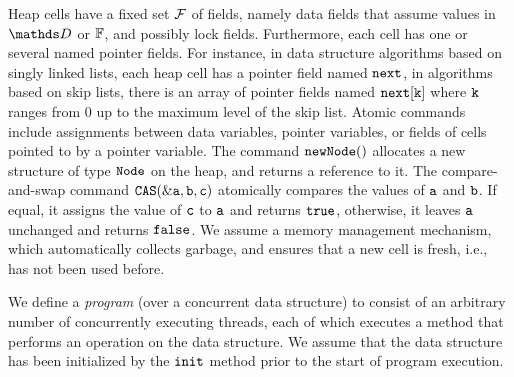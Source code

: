 %
Heap cells have a fixed set $\mathcal{F}$ of fields, namely
data fields that assume values in
$\ddomain$ or $\mathbb{F}$, and possibly lock fields.
Furthermore, each cell has one or several named pointer fields.
For instance, in data structure algorithms based on singly linked lists,
each heap cell has a pointer field named ${\tt next}$, in algorithms
based on skip lists, there is an array of pointer fields named
${\tt next[k]}$ where ${\tt k}$ ranges from $0$ up to the maximum level of the
skip list.
Atomic commands include assignments between data variables, 
pointer variables, or fields of cells pointed to by a pointer variable.
%
The command ${\tt new Node()}$ allocates a new structure of type
${\tt Node}$ on the heap, and returns a reference to it.
%
The compare-and-swap command ${\tt CAS(\&a,b,c)}$ atomically
compares the values of ${\tt a}$ and ${\tt b}$.
If  equal, it assigns the value of
${\tt c}$ to ${\tt a}$  and returns ${\tt true}$, 
otherwise, it leaves ${\tt a}$ unchanged and returns ${\tt false}$. 
%
We assume a memory management mechanism, which automatically collects
garbage, and ensures that a new cell is fresh, i.e., has
not been used before.

We define a {\em program} (over a concurrent data structure) to consist 
of an arbitrary number of concurrently executing threads, each of which
executes a method that performs an operation
on the data structure. We assume that the data structure has been initialized
by the ${\tt init}$ method prior to the start of program execution.

